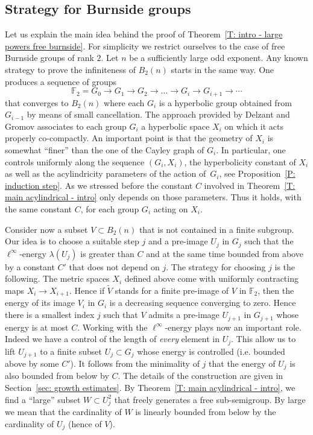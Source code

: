 \documentclass[11pt]{article}
\theoremstyle{plain}
\theoremstyle{definition}
\begin{document}
\subsection{Strategy for Burnside groups}
\label{sec: strategy for burnside groups}
Let us explain the main idea behind the proof of Theorem~\ref{T: intro - large powers free burnside}.
For simplicity we restrict ourselves to the case of free Burnside groups of rank $2$.
Let $n$ be a sufficiently large odd exponent.
Any known strategy to prove the infiniteness of $B_2(n)$ starts in the same way.
One produces a sequence of groups
\begin{equation}
\label{eqn: approx sequence}
\mathbb F_2 = G_0 \to G_1 \to G_2 \to \dots \to G_i \to G_{i +1} \to \cdots
\end{equation}
that converges to $B_2(n)$ where each $G_i$ is a hyperbolic group obtained from $G_{i-1}$ by means of small cancellation.
The approach provided by Delzant and Gromov associates to each group $G_i$ a hyperbolic space $X_i$ on which it acts properly co-compactly.
An important point is that the geometry of $X_i$ is somewhat ``finer'' than the one of the Cayley graph of $G_i$.
In particular, one controls uniformly along the sequence $(G_i, X_i)$, the hyperbolicity constant of $X_i$ as well as the acylindricity parameters of the action of~$G_i$, see Proposition~\ref{P: induction step}.
As we stressed before the constant $C$ involved in Theorem~\ref{T: main acylindrical - intro} only depends on those parameters.
Thus it holds, with the same constant $C$, for each group $G_i$ acting on $X_i$.

Consider now a subset $V\subset B_2(n)$ that is not contained in a finite subgroup.
Our idea is to choose a suitable step $j$ and a pre-image $U_j$ in $G_j$ such that the $\ell^\infty$-energy $\lambda(U_j)$ is greater than $C$ and at the same time bounded from above by a constant $C'$ that does not depend on $j$.
The strategy for choosing $j$ is the following.
The metric spaces $X_i$ defined above come with uniformly contracting maps $X_i \to X_{i+1}$.
Hence if $\tilde V$ stands for a finite pre-image of $V$ in $\mathbb F_2$, then the energy of its image $V_i$ in $G_i$ is a decreasing sequence converging to zero.
Hence there is a smallest index $j$ such that $V$ admits a pre-image $U_{j+1}$ in $G_{j+1}$ whose energy is at most $C$.
Working with the $\ell^\infty$-energy plays now an important role.
Indeed we have a control of the length of \emph{every} element in $U_j$.
This allow us to lift $U_{j+1}$ to a finite subset $U_j \subset G_j$ whose energy is controlled (i.e. bounded above by some $C'$).
It follows from the minimality of $j$ that the energy of $U_j$ is also bounded from below by $C$.
The details of the construction are given in Section~\ref{sec: growth estimates}.
By Theorem~\ref{T: main acylindrical - intro}, we find a ``large'' subset $W \subset U_j^2$ that freely generates a free sub-semigroup.
By large we mean that the cardinality of $W$ is linearly bounded from below by the cardinality of $U_j$ (hence of $V$).
\end{document}
